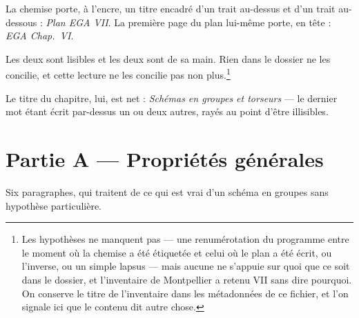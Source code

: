 \documentclass[11pt,a4paper]{article}
\begin{document}
La chemise porte, à l'encre, un titre encadré d'un trait au-dessus et d'un
trait au-dessous : \emph{Plan EGA VII}. La première page du plan lui-même porte,
en tête : \emph{EGA Chap.\ VI}.

Les deux sont lisibles et les deux sont de sa main. Rien dans le dossier ne les
concilie, et cette lecture ne les concilie pas non plus.\footnote{Les
hypothèses ne manquent pas --- une renumérotation du programme entre le moment
où la chemise a été étiquetée et celui où le plan a été écrit, ou l'inverse, ou
un simple lapsus --- mais aucune ne s'appuie sur quoi que ce soit dans le
dossier, et l'inventaire de Montpellier a retenu VII sans dire pourquoi. On
conserve le titre de l'inventaire dans les métadonnées de ce fichier, et l'on
signale ici que le contenu dit autre chose.}

Le titre du chapitre, lui, est net : \emph{Schémas en groupes et torseurs} --- le
dernier mot étant écrit par-dessus un ou deux autres, rayés au point d'être
illisibles.

\section*{Partie A --- Propriétés générales}

Six paragraphes, qui traitent de ce qui est vrai d'un schéma en groupes sans
hypothèse particulière.
\end{document}
